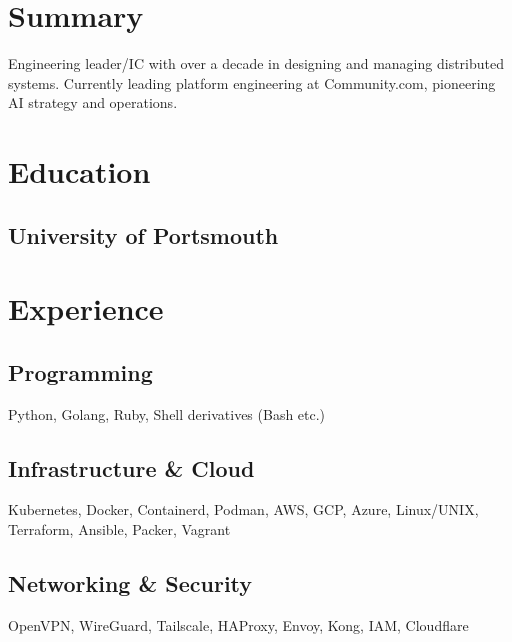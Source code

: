 \documentclass[]{resume}
\begin{document}
\begin{minipage}[t]{0.33\textwidth}


\section{Summary}
Engineering leader/IC with over a decade in designing and managing distributed systems. Currently leading platform engineering at Community.com, pioneering AI strategy and operations. 
\sectionsep


\section{Education}

\subsection{University of Portsmouth}
\sectionsep


\section{Experience}
\subsection{Programming}
Python, Golang, Ruby, Shell derivatives (Bash etc.)
\sectionsep

\subsection{Infrastructure \& Cloud}
Kubernetes, Docker, Containerd, Podman, AWS, GCP, Azure, Linux/UNIX, Terraform, Ansible, Packer, Vagrant
\sectionsep

\subsection{Networking \& Security}
OpenVPN, WireGuard, Tailscale, HAProxy, Envoy, Kong, IAM, Cloudflare
\sectionsep


\end{minipage}
\end{document}

